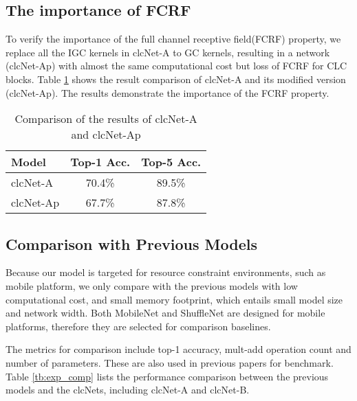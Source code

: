 \documentclass[10pt,twocolumn,letterpaper]{article}
\begin{document}
\subsection{The importance of FCRF}
To verify the importance of the full channel receptive field(FCRF) property, we replace all the IGC kernels in clcNet-A to GC kernels, resulting in a network (clcNet-Ap) with almost the same computational cost but loss of FCRF for CLC blocks. Table \ref{tb:fcrf} shows the result comparison of clcNet-A and its modified version (clcNet-Ap). The results demonstrate the importance of the FCRF property.
\begin{table}[h!]
\begin{center}
\begin{tabular}{l|c|c}
\hline
Model &  Top-1 Acc.  & Top-5  Acc.\\
\hline\hline
clcNet-A  &  70.4\%  & 89.5\% \\
clcNet-Ap &  67.7\%  & 87.8\% \\
\hline
\end{tabular}
\end{center}
\caption{Comparison of the results of clcNet-A and clcNet-Ap}
\label{tb:fcrf}
\end{table}
\subsection{Comparison with Previous Models}
Because our model is targeted for resource constraint environments, such as mobile platform, we only compare with the previous models with low computational cost, and small memory footprint, which entails small model size and network width. Both MobileNet\cite{mobilenet2017howard} and ShuffleNet\cite{shufflenet2017xiangyu} are designed for mobile platforms, therefore they are selected for comparison baselines.

The metrics for comparison include top-1 accuracy, mult-add operation count and number of parameters. These are also used in previous papers for benchmark.  Table \ref{tb:exp_comp} lists the performance comparison between the previous models and the clcNets, including clcNet-A and clcNet-B.
\end{document}
